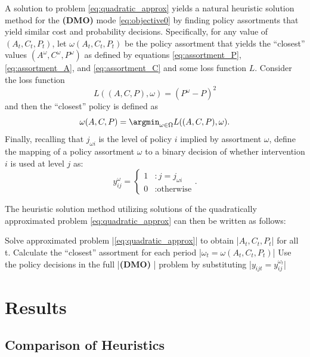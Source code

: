 \documentclass{article}
\newcommand{\model}{{\bf (DMO) }}
\begin{document}
A solution to problem \eqref{eq:quadratic_approx} yields a natural heuristic solution method for the \model mode \eqref{eq:objective0} by finding policy assortments that yield similar cost and probability decisions. Specifically, for any value of $(A_t, C_t, P_t)$, let $\omega(A_t,C_t,P_t)$ be the policy assortment that yields the ``closest'' values $(A^\omega, C^\omega, P^\omega)$ as defined by equations \eqref{eq:assortment_P}, \eqref{eq:assortment_A}, and \eqref{eq:assortment_C} and some loss function $L$. Consider the loss function
\begin{equation}\label{eq:assortment_loss_function}
    L((A,C,P),\omega) =(P^\omega-P)^2
\end{equation}
and then the ``closest'' policy is defined as
\begin{equation}\label{eq:assortment_loss_minimizer}
    \omega(A,C,P) = \argmin_{\omega\in \Omega} L((A,C,P),\omega).
\end{equation}
Finally, recalling that $j_{\omega i}$ is the level of policy $i$ implied by assortment $\omega$, define the mapping of a policy assortment $\omega$ to a binary decision of whether intervention $i$ is used at level $j$ as:
\begin{equation}
    y_{ij}^{\omega} = \begin{cases}1 &: j=j_{\omega i}\\ 0 &: \text{otherwise}\end{cases}.
\end{equation}

The heuristic solution method utilizing solutions of the quadratically approximated problem \eqref{eq:quadratic_approx} can then be written as follows:
\begin{pseudocode}
    Solve approximated problem |\eqref{eq:quadratic_approx}| to obtain |$A_t, C_t, P_t$| for all t.
    Calculate the ``closest'' assortment for each period |$\omega_t = \omega(A_t,C_t,P_t)$|
    Use the policy decisions in the full |\model| problem by substituting |$y_{ijt}=y^{\omega_t}_{ij}$|
\end{pseudocode}


\section{Results}

\subsection{Comparison of Heuristics}\label{sec:comparison_of_heuristics}
\end{document}
